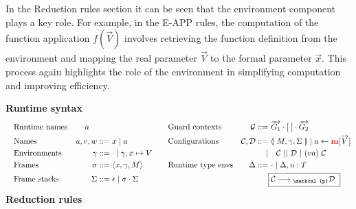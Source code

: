 \documentclass{l4proj}
\begin{document}
In the Reduction rules section it can be seen that the environment component plays a key role. For example, in the E-APP rules, the computation of the function application $f(\overrightarrow V)$ involves retrieving the function definition from the environment and mapping the real parameter $\overrightarrow V$ to the formal parameter $\overrightarrow x$. This process again highlights the role of the environment in simplifying computation and improving efficiency.

\textbf{Runtime syntax}
\vspace{-\baselineskip} 
\begin{align*}
 \quad &\text{Runtime names} & a \quad & && \text{Guard contexts} \quad & \mathcal{G} ::=& \ \overrightarrow{G_1} \cdot [ \; ] \cdot \overrightarrow{G_2} \\
 \quad &\text{Names}        & u, v, w  & ::= x \mid a && \text{Configurations} & \mathcal{C}, \mathcal{D} ::=& \ \llparenthesis \ M, \gamma, \Sigma \ \rrparenthesis \mid a \leftarrow \textcolor{red!80!black}{\textbf{m}} [\overrightarrow{V}] \\
 \quad &\text{Environments} & \gamma  & ::=  \cdot \mid \gamma, x \mapsto V \quad  &&& \mid & \quad \mathcal{C} \ || \ \mathcal{D} \ | \ (va) \ \mathcal{C} \\
 \quad &\text{Frames}       & \sigma  & ::=  \langle x,\gamma, M \rangle && \text{Runtime type envs} & \Delta  ::=& \ \cdot \mid \Delta, u : T \\
 \quad &\text{Frame stacks} & \Sigma  & ::= \epsilon \mid \sigma \cdot \Sigma &&&& \fbox{%
    $ \mathcal{C} \longrightarrow{} _\mathcal{p}\mathcal{D}$
}
\end{align*}
\vspace{-0.5\baselineskip} 
\textbf{Reduction rules}
\end{document}
